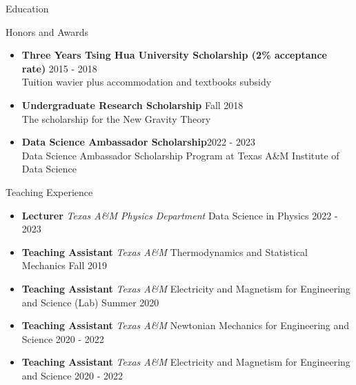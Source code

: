 \documentclass{resume}
\begin{document}
\begin{rSection}{Education}



\begin{rSection}{Honors and Awards}
    \begin{itemize}
        \item \textbf{Three Years Tsing Hua University Scholarship (2\% acceptance rate)} \hfill 2015 - 2018 \\
        Tuition wavier plus accommodation and textbooks subsidy
        \item \textbf{Undergraduate Research Scholarship} \hfill Fall 2018 \\
        The scholarship for the New Gravity Theory
        \item \textbf{Data Science Ambassador Scholarship}\hfill 2022 - 2023\\
        Data Science Ambassador Scholarship Program at Texas A\&M Institute of Data Science
    \end{itemize}
\end{rSection}


\begin{rSection}{Teaching Experience}
    \begin{itemize}
        \item \textbf{Lecturer} {{\it Texas A\&M Physics Department} Data Science in Physics} \hfill 2022 - 2023
        \item \textbf{Teaching Assistant} {{\it Texas A\&M} Thermodynamics and Statistical Mechanics} \hfill Fall 2019
        \item \textbf{Teaching Assistant} {{\it Texas A\&M} Electricity and Magnetism for Engineering and Science (Lab)} \hfill Summer 2020
        \item \textbf{Teaching Assistant} {{\it Texas A\&M} Newtonian Mechanics for Engineering and Science} \hfill 2020 - 2022
        \item \textbf{Teaching Assistant} {{\it Texas A\&M} Electricity and Magnetism for Engineering and Science} \hfill 2020 - 2022
    \end{itemize}
\end{rSection}


\end{rSection}
\end{document}
